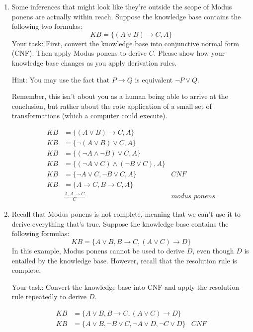 \documentclass[10pt]{article}
\begin{document}
\begin{enumerate}[label=(\alph*)]

  \item Some inferences that might look like they're outside the scope of Modus ponens are actually within reach. Suppose the knowledge base contains the following two formulas:
  $$KB = \{ (A \vee B) \rightarrow C, A \}$$
  Your task: First, convert the knowledge base into conjunctive normal form (CNF). Then apply Modus ponens to derive $C$. Please show how your knowledge base changes as you apply derivation rules.
  
  Hint: You may use the fact that $P \rightarrow Q$ is equivalent $\neg P \vee Q$.
  
  Remember, this isn't about you as a human being able to arrive at the conclusion, but rather about the rote application of a small set of transformations (which a computer could execute).
  
  \begin{align*}
  KB &= \{ (A \vee B) \rightarrow C, A \}\\
  KB &= \{ \neg (A \vee B) \vee C, A \}\\
  KB &= \{ (\neg A \wedge \neg B) \vee C, A \}\\
  KB &= \{ (\neg A \vee C) \wedge (\neg B \vee C), A \}\\
  KB &= \{ \neg A \vee C, \neg B \vee C, A \} &\textit{CNF}\\
  KB &= \{ A \rightarrow C, B \rightarrow C, A \}\\
  &\frac{A, A \rightarrow C}{C} &\textit{modus ponens}
  \end{align*}
  
  \item Recall that Modus ponens is not complete, meaning that we can't use it to derive everything that's true. Suppose the knowledge base contains the following formulas:
  $$KB = \{ A \vee B, B \rightarrow C, (A \vee C) \rightarrow D \}$$
  In this example, Modus ponens cannot be used to derive $D$, even though $D$ is entailed by the knowledge base. However, recall that the resolution rule is complete.
  
  Your task: Convert the knowledge base into CNF and apply the resolution rule repeatedly to derive $D$.
  
  \begin{align*}
  KB &= \{ A \vee B, B \rightarrow C, (A \vee C) \rightarrow D \}\\
  KB &= \{ A \vee B, \neg B \vee C, \neg A \vee D, \neg C \vee D \} &\textit{CNF}
  \end{align*}
  

\end{enumerate}
\end{document}
